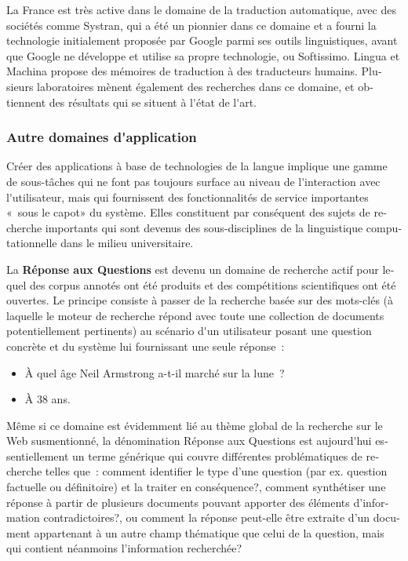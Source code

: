 \begin{french}
\begin{multicols}{2}
La France est très active dans le domaine de la traduction
automatique, avec des sociétés comme Systran, qui a été un pionnier
dans ce domaine et a fourni la technologie initialement proposée par
Google parmi ses outils linguistiques, avant que Google ne développe
et utilise sa propre technologie, ou Softissimo. Lingua et Machina
propose des mémoires de traduction à des traducteurs
humains. Plusieurs laboratoires mènent également des recherches dans
ce domaine, et obtiennent des résultats qui se situent à l{\mbox '}état de
l{\mbox '}art.\\

\subsubsection{Autre domaines d{\mbox '}application}

Créer des applications à base de technologies de la langue implique
une gamme de sous-tâches qui ne font pas toujours surface au niveau de
l{\mbox '}interaction avec l{\mbox '}utilisateur, mais qui fournissent des
fonctionnalités de service importantes «~sous le capot» du
système. Elles constituent par conséquent des sujets de recherche
importants qui sont devenus des sous-disciplines de la linguistique
computationnelle dans le milieu universitaire.

La {\bf Réponse aux Questions} est devenu un domaine de recherche actif pour
lequel des corpus annotés ont été produits et des compétitions
scientifiques ont été ouvertes. Le principe consiste à passer de la recherche
basée sur des mots-clés (à laquelle le moteur de recherche répond avec
toute une collection de documents potentiellement pertinents) au
scénario d{\mbox '}un utilisateur posant une question concrète et du système
lui fournissant une seule réponse~: 
\begin{itemize}
\item À quel âge Neil Armstrong a-t-il marché sur la lune~? 
\item À 38  ans.
\end{itemize}
Même si ce domaine est évidemment lié au thème global de la recherche
sur le Web susmentionné, la dénomination Réponse aux Questions est
aujourd{\mbox '}hui essentiellement un terme générique qui couvre
différentes problématiques de recherche telles que~: comment
identifier le type d'une question (par ex. question factuelle ou
définitoire) et la traiter en conséquence?, comment synthétiser une
réponse à partir de plusieurs documents pouvant apporter des éléments
d'information contradictoires?, ou comment la réponse peut-elle être
extraite d'un document appartenant à un autre champ thématique que
celui de la question, mais qui contient néanmoins l'information
recherchée?


\end{multicols}
\end{french}
